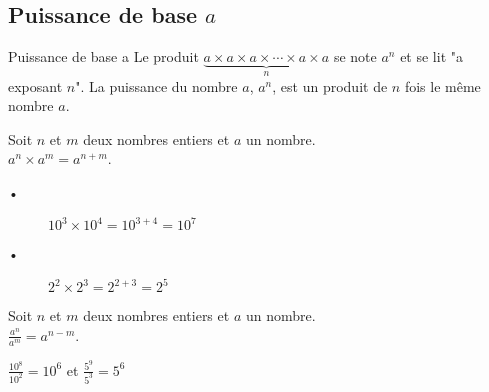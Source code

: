 \begin{pageCours} 



\section{Puissance de base $a$}



\begin{DefT}{Puissance de base a}
Le produit $\underbrace{a \times a \times a \times \cdots \times a \times a}_n$ se note $a^n$ et se lit "a exposant $n$".  
La puissance du nombre $a$, $a^n$, est un produit de $n$ fois le même nombre $a$.
\end{DefT}
 
\begin{minipage}[t]{0.49\linewidth}
\begin{Prop}
Soit $n$ et $m$ deux nombres entiers et $a$ un nombre.\\
$a^n \times a^m = a^{n+m}$.
\end{Prop}
 \begin{Ex}
 \begin{description}
 \item[•] $10^3 \times 10^4 = 10^{3+4}=10^7$
 \item[•] $2^2 \times 2^3 = 2^{2+3}=2^5$ 
  \end{description}
 \end{Ex}
\end{minipage}
 \hfill
\begin{minipage}[t]{0.49\linewidth}
\begin{Prop}
Soit $n$ et $m$ deux nombres entiers et $a$ un nombre.\\
$\frac{a^n}{a^m} = a^{n-m}$.
\end{Prop}
 \begin{Ex}
$\frac{10^8}{10^2} = 10^6$ et $\frac{5^9}{5^3} = 5^6$
 \end{Ex}
\end{minipage}
 

\begin{minipage}{0.48\linewidth}


\end{minipage}
\end{pageCours}
